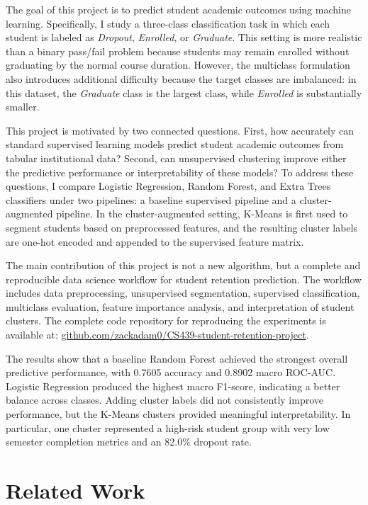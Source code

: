 \documentclass{article}
\begin{document}
The goal of this project is to predict student academic outcomes using machine learning. Specifically, I study a three-class classification task in which each student is labeled as \textit{Dropout}, \textit{Enrolled}, or \textit{Graduate}. This setting is more realistic than a binary pass/fail problem because students may remain enrolled without graduating by the normal course duration. However, the multiclass formulation also introduces additional difficulty because the target classes are imbalanced: in this dataset, the \textit{Graduate} class is the largest class, while \textit{Enrolled} is substantially smaller.

This project is motivated by two connected questions. First, how accurately can standard supervised learning models predict student academic outcomes from tabular institutional data? Second, can unsupervised clustering improve either the predictive performance or interpretability of these models? To address these questions, I compare Logistic Regression, Random Forest, and Extra Trees classifiers under two pipelines: a baseline supervised pipeline and a cluster-augmented pipeline. In the cluster-augmented setting, K-Means is first used to segment students based on preprocessed features, and the resulting cluster labels are one-hot encoded and appended to the supervised feature matrix.

The main contribution of this project is not a new algorithm, but a complete and reproducible data science workflow for student retention prediction. The workflow includes data preprocessing, unsupervised segmentation, supervised classification, multiclass evaluation, feature importance analysis, and interpretation of student clusters. The complete code repository for reproducing the experiments is available at:
\href{https://github.com/zackadam0/CS439-student-retention-project}{github.com/zackadam0/CS439-student-retention-project}.

The results show that a baseline Random Forest achieved the strongest overall predictive performance, with 0.7605 accuracy and 0.8902 macro ROC-AUC. Logistic Regression produced the highest macro F1-score, indicating a better balance across classes. Adding cluster labels did not consistently improve performance, but the K-Means clusters provided meaningful interpretability. In particular, one cluster represented a high-risk student group with very low semester completion metrics and an 82.0\% dropout rate.

\section{Related Work}
\end{document}
